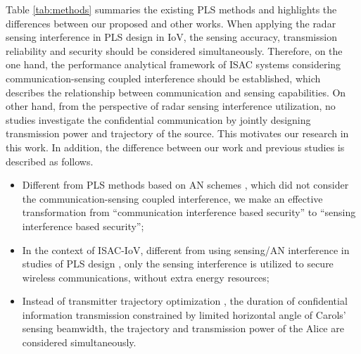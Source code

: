 Table \ref{tab:methods} summaries the existing PLS methods and highlights the differences between our proposed and other works.
When applying the radar sensing interference in PLS design in IoV, the sensing accuracy, transmission reliability and security should be considered simultaneously. Therefore, on the one hand, the performance analytical framework of ISAC systems considering communication-sensing coupled interference should be established, which describes the relationship between communication and sensing capabilities. On other hand, from the perspective of radar sensing interference utilization, no studies investigate the confidential communication by jointly designing transmission power and trajectory of the source.
This motivates our research in this work. 
In addition, the difference between our work and previous studies is described as follows.
\begin{itemize}
  \item Different from PLS methods based on AN schemes \cite{wang2020physical,Zhang2019Transmit,Xu2021Low}, which did not consider the communication-sensing coupled interference, we make an effective transformation from ``communication interference based security'' to ``sensing interference based security'';
  \item In the context of ISAC-IoV, different from using sensing/AN interference in studies of PLS design \cite{salem2022active,su2020secure}, only the sensing interference is utilized to secure wireless communications, without extra energy resources;
  \item Instead of transmitter trajectory optimization \cite{Li2019UAV,Xu2021Low,Sun2021Unmanned}, the duration of confidential information transmission constrained by limited horizontal angle of Carols' sensing beamwidth, the trajectory and transmission power of the Alice are considered simultaneously.
\end{itemize}
